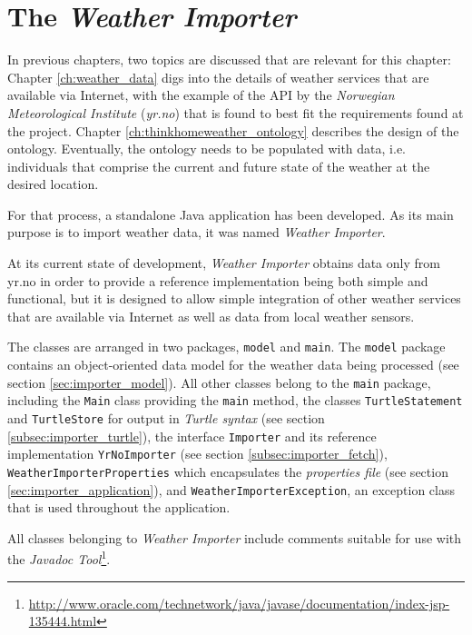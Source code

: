 \chapter{The \emph{Weather Importer}}
\label{ch:weather}

In previous chapters, two topics are discussed that are relevant for this chapter: Chapter \ref{ch:weather_data} digs into the details of weather services that are available via Internet, with the example of the API by the \emph{Norwegian Meteorological Institute} (\emph{yr.no}) that is found to best fit the requirements found at the \thinkhome project. Chapter \ref{ch:thinkhomeweather_ontology} describes the design of the \thinkhomeweather ontology. Eventually, the ontology needs to be populated with data, i.e. individuals that comprise the current and future state of the weather at the desired location.

For that process, a standalone Java application has been developed. As its main purpose is to import weather data, it was named \emph{Weather Importer}.

At its current state of development, \emph{Weather Importer} obtains data only from yr.no in order to provide a reference implementation being both simple and functional, but it is designed to allow simple integration of other weather services that are available via Internet as well as data from local weather sensors.

The classes are arranged in two packages, \texttt{model} and \texttt{main}. The \texttt{model} package contains an object-oriented data model for the weather data being processed (see section \ref{sec:importer_model}). All other classes belong to the \texttt{main} package, including the \texttt{Main} class providing the \texttt{main} method, the classes \texttt{TurtleStatement} and \texttt{TurtleStore} for output in \emph{Turtle syntax} (see section \ref{subsec:importer_turtle}), the interface \texttt{Importer} and its reference implementation \texttt{YrNoImporter} (see section \ref{subsec:importer_fetch}), \texttt{WeatherImporterProperties} which encapsulates the \emph{properties file} (see section \ref{sec:importer_application}), and \texttt{WeatherImporterException}, an exception class that is used throughout the application.

All classes belonging to \emph{Weather Importer} include comments suitable for use with the \emph{Javadoc Tool}\footnote{\href{http://www.oracle.com/technetwork/java/javase/documentation/index-jsp-135444.html}{http://www.oracle.com/technetwork/java/javase/documentation/index-jsp-135444.html}}.

